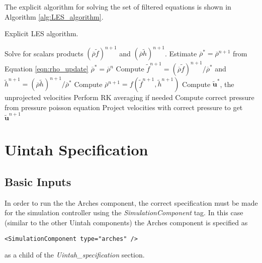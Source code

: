 The explicit algorithm for solving the set of filtered equations is shown in Algorithm \ref{alg:LES_algorithm}.  
%
%
\begin{algorithm}[t]
\caption{Explicit LES algorithm.}\label{alg:LES_algorithm}
%
\begin{algorithmic}[] %
\STATE 	Solve for scalars products $(\overline{\rho} \widetilde{f})^{n+1}$ and $(\overline{\rho} \widetilde{h})^{n+1}$.
\STATE	Estimate $\overline{\rho}^* = \overline{\rho}^{n+1}$ from Equation \ref{eqn:rho_update}
\STATE $\overline{\rho}^* = \overline{\rho}^{n}$
\ENDIF
\STATE Compute $\widetilde{f}^{n+1} = (\overline{\rho}\widetilde{f})^{n+1}/{\overline{\rho}^*}$ and $\widetilde{h}^{n+1} = (\overline{\rho}\widetilde{h})^{n+1}/{\overline{\rho}^*}$ 
\STATE Compute $\overline{\rho}^{n+1} = f(\widetilde{f}^{n+1}, \widetilde{h}^{n+1})$
\STATE Compute $\widetilde{\mathbf{u}}^*$, the unprojected velocities
\STATE Perform RK averaging if needed
\STATE Compute correct pressure from pressure poisson equation
\STATE Project velocities with correct pressure to get $\widetilde{\mathbf{u}}^{n+1}$ 
\ENDFOR
\ENDFOR
\end{algorithmic}
\end{algorithm}

\section{Uintah Specification}
%
\subsection{Basic Inputs}
%
In order to run the the Arches component, the correct specification must be made for the simulation controller using the {\it SimulationComponent} tag.  In this case (similar to the other Uintah components) the Arches component is specified as
%
\begin{Verbatim}[fontsize=\footnotesize]
<SimulationComponent type="arches" />
\end{Verbatim}
%
as a child of the {\it Uintah\_specification} section.  

